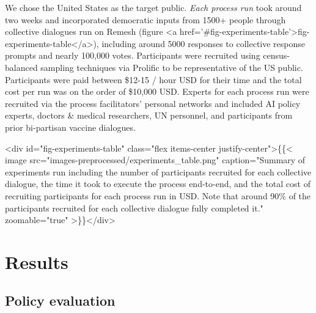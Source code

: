 \documentclass{article}
\begin{document}
We chose the United States as the target public. \emph{Each process run} took around two weeks and incorporated democratic inputs from 1500+ people through collective dialogues run on Remesh (figure <a href='#fig-experiments-table'>fig-experiments-table</a>), including around 5000 responses to collective response prompts and nearly 100,000 votes. Participants were recruited using census-balanced sampling techniques via Prolific to be representative of the US public. Participants were paid between \$12-15 / hour USD for their time and the total cost per run was on the order of \$10,000 USD. Experts for each process run were recruited via the process facilitators' personal networks and included AI policy experts, doctors \& medical researchers, UN personnel, and participants from prior bi-partisan vaccine dialogues. 

<div id="fig-experiments-table" class="flex items-center justify-center">\{\{< image src="images-preprocessed/experiments_table.png" caption="Summary of experiments run including the number of participants recruited for each collective dialogue, the time it took to execute the process end-to-end, and the total cost of recruiting participants for each process run in USD. Note that around 90\% of the participants recruited for each collective dialogue fully completed it." zoomable="true" >\}\}</div>



\section{Results}

\subsection{Policy evaluation}
\end{document}
